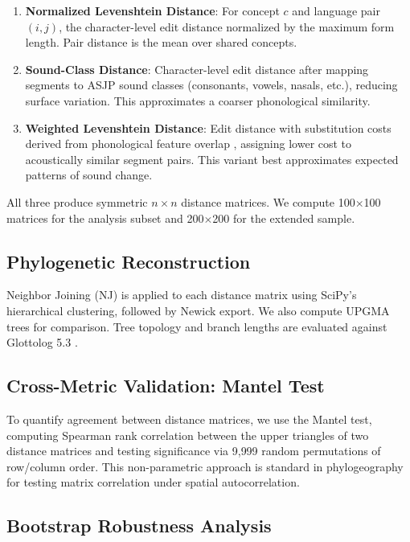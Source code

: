 \documentclass[manuscript]{clv2025}
\begin{document}
\begin{enumerate}
  \item \textbf{Normalized Levenshtein Distance}: For concept $c$ and language pair $(i, j)$, the character-level edit distance normalized by the maximum form length. Pair distance is the mean over shared concepts.
  \item \textbf{Sound-Class Distance}: Character-level edit distance after mapping segments to ASJP sound classes (consonants, vowels, nasals, etc.), reducing surface variation. This approximates a coarser phonological similarity.
  \item \textbf{Weighted Levenshtein Distance}: Edit distance with substitution costs derived from phonological feature overlap \cite{dolgopolsky1986probabilistic}, assigning lower cost to acoustically similar segment pairs. This variant best approximates expected patterns of sound change.
\end{enumerate}

All three produce symmetric $n \times n$ distance matrices. We compute 100$\times$100 matrices for the analysis subset and 200$\times$200 for the extended sample.

\subsection{Phylogenetic Reconstruction}

Neighbor Joining (NJ) \cite{saitou1987nj} is applied to each distance matrix using SciPy's hierarchical clustering, followed by Newick export. We also compute UPGMA trees for comparison. Tree topology and branch lengths are evaluated against Glottolog 5.3 \cite{hammarstrom_glottolog4}.

\subsection{Cross-Metric Validation: Mantel Test}

To quantify agreement between distance matrices, we use the Mantel test, computing Spearman rank correlation between the upper triangles of two distance matrices and testing significance via 9{,}999 random permutations of row/column order. This non-parametric approach is standard in phylogeography for testing matrix correlation under spatial autocorrelation.

\subsection{Bootstrap Robustness Analysis}
\end{document}
